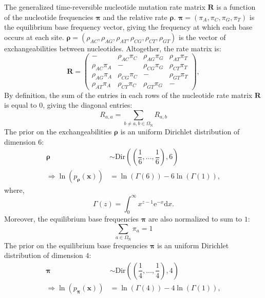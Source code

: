 \documentclass{article}
\newcommand{\der}{\mathrm{d}}
\newcommand{\e}{\mathrm{e}}
\newcommand{\SetNuc}{\Omega_{\mathrm{N}}}
\newcommand{\mutmatrix}{R}
\newcommand{\Mutmatrix}{\bm{\mutmatrix}}
\newcommand{\exchan}{\rho}
\newcommand{\Exchan}{\bm{\exchan}}
\newcommand{\mutequi}{\pi}
\newcommand{\Mutequi}{\bm{\mutequi}}
\begin{document}
The generalized time-reversible nucleotide mutation rate matrix $\Mutmatrix$ is a function of the nucleotide frequencies $\Mutequi$ and the relative rate $\Exchan$. $\Mutequi = (\mutequi_A , \mutequi_C , \mutequi_G , \mutequi_T)$ is the equilibrium base frequency vector, giving the frequency at which each base occurs at each site. $\Exchan = \left( \exchan_{AC}, \exchan_{AG}, \exchan_{AT}, \exchan_{CG}, \exchan_{CT}, \exchan_{GT}\right)$ is the vector of exchangeabilities between nucleotides. Altogether, the rate matrix is:
\begin{equation}
\Mutmatrix = \begin{pmatrix}
- & {\exchan_{AC} \mutequi_C} & {\exchan_{AG}\mutequi_G} & {\exchan_{AT}\mutequi_T} \\ 
{\exchan_{AC}\mutequi_A} & - & {\exchan_{CG}\mutequi_G} & {\exchan_{CT}\mutequi_T} \\ 
{\exchan_{AG}\mutequi_A} & {\exchan_{CG}\mutequi_C} & - & {\exchan_{GT}\mutequi_T} \\  
{\exchan_{AT}\mutequi_A} & {\exchan_{CT}\mutequi_C} & {\exchan_{GT}\mutequi_G} & - 
\end{pmatrix},
\end{equation}
By definition, the sum of the entries in each rows of the nucleotide rate matrix $\Mutmatrix$ is equal to $0$, giving the diagonal entries:
\begin{equation}
\mutmatrix_{a,a} = \sum_{ b \neq a, b \in \SetNuc} \mutmatrix_{a,b}
\end{equation}
The prior on the exchangeabilities $\Exchan$ is an uniform Dirichlet distribution of dimension $6$:
\begin{align}
\Exchan & \sim \mathrm{Dir}\left( \left( \dfrac{1}{6}, \hdots , \dfrac{1}{6} \right) , 6\right) \\
\Rightarrow \ln \left(p_{\Exchan}\left(\bm{x}\right)\right) & = \ln \left(\Gamma(6)\right) - 6\ln\left(\Gamma(1)\right), 
\end{align}
where, 
\begin{equation}
\Gamma(z) = \int_{0}^{\infty} x^{z-1} \e^{-x} \der x.
\end{equation}
Moreover, the equilibrium base frequencies $\Mutequi$ are also normalized to sum to $1$: 
\begin{equation}
\sum_{a \in \SetNuc} \mutequi_a  = 1
\end{equation}
The prior on the equilibrium base frequencies $\Mutequi$ is an uniform Dirichlet distribution of dimension $4$:
\begin{align}
\Mutequi & \sim \mathrm{Dir}\left( \left( \dfrac{1}{4}, \hdots , \dfrac{1}{4} \right) , 4\right) \\
\Rightarrow \ln \left(p_{\Mutequi}\left(\bm{x}\right)\right) & = \ln \left(\Gamma(4)\right) - 4\ln\left(\Gamma(1)\right), 
\end{align}
\end{document}
